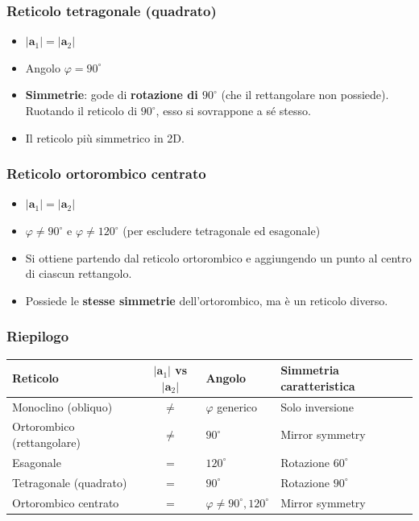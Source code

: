 \subsubsection{Reticolo tetragonale (quadrato)}
\begin{itemize}
    \item $|\mathbf{a}_1| = |\mathbf{a}_2|$
    \item Angolo $\varphi = 90^\circ$
    \item \textbf{Simmetrie}: gode di \textbf{rotazione di $90^\circ$} (che il rettangolare non possiede). Ruotando il reticolo di $90^\circ$, esso si sovrappone a sé stesso.
    \item Il reticolo più simmetrico in 2D.
\end{itemize}

\subsubsection{Reticolo ortorombico centrato}
\begin{itemize}
    \item $|\mathbf{a}_1| = |\mathbf{a}_2|$
    \item $\varphi \neq 90^\circ$ e $\varphi \neq 120^\circ$ (per escludere tetragonale ed esagonale)
    \item Si ottiene partendo dal reticolo ortorombico e aggiungendo un punto al centro di ciascun rettangolo.
    \item Possiede le \textbf{stesse simmetrie} dell'ortorombico, ma è un reticolo diverso.
\end{itemize}

\subsubsection{Riepilogo}

\begin{table}[h!]
\centering
\renewcommand{\arraystretch}{1.3}
\begin{tabular}{|l|c|l|l|}
\hline
\textbf{Reticolo} & \textbf{$\vert\mathbf{a}_1\vert$ vs $\vert\mathbf{a}_2\vert$} & \textbf{Angolo} & \textbf{Simmetria caratteristica} \\ \hline
Monoclino (obliquo) & $\neq$ & $\varphi$ generico & Solo inversione \\ \hline
Ortorombico (rettangolare) & $\neq$ & $90^\circ$ & Mirror symmetry \\ \hline
Esagonale & $=$ & $120^\circ$ & Rotazione $60^\circ$ \\ \hline
Tetragonale (quadrato) & $=$ & $90^\circ$ & Rotazione $90^\circ$ \\ \hline
Ortorombico centrato & $=$ & $\varphi \neq 90^\circ, 120^\circ$ & Mirror symmetry \\ \hline
\end{tabular}
\end{table}

